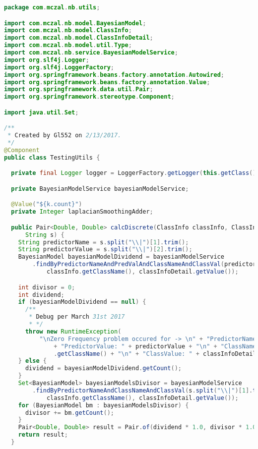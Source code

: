 \begin{lstlisting}[language=Java,basicstyle=\tiny,caption=TestingUtils.java]
package com.mczal.nb.utils;

import com.mczal.nb.model.BayesianModel;
import com.mczal.nb.model.ClassInfo;
import com.mczal.nb.model.ClassInfoDetail;
import com.mczal.nb.model.util.Type;
import com.mczal.nb.service.BayesianModelService;
import org.slf4j.Logger;
import org.slf4j.LoggerFactory;
import org.springframework.beans.factory.annotation.Autowired;
import org.springframework.beans.factory.annotation.Value;
import org.springframework.data.util.Pair;
import org.springframework.stereotype.Component;

import java.util.Set;

/**
 * Created by Gl552 on 2/13/2017.
 */
@Component
public class TestingUtils {

  private final Logger logger = LoggerFactory.getLogger(this.getClass());

  private BayesianModelService bayesianModelService;

  @Value("${k.count}")
  private Integer laplacianSmoothingAdder;

  public Pair<Double, Double> calcDiscrete(ClassInfo classInfo, ClassInfoDetail classInfoDetail,
      String s) {
    String predictorName = s.split("\\|")[1].trim();
    String predictorValue = s.split("\\|")[2].trim();
    BayesianModel bayesianModelDividend = bayesianModelService
        .findByPredictorNameAndPredValAndClassNameAndClassVal(predictorName, predictorValue,
            classInfo.getClassName(), classInfoDetail.getValue());

    int divisor = 0;
    int dividend;
    if (bayesianModelDividend == null) {
      /**
       * Debug per March 31st 2017
       * */
      throw new RuntimeException(
          "\nZero Frequency problem occured for -> \n" + "PredictorName: " + predictorName + "\n"
              + "PredictorValue: " + predictorValue + "\n" + "ClassName: " + classInfo
              .getClassName() + "\n" + "ClassValue: " + classInfoDetail.getValue() + "\n");
    } else {
      dividend = bayesianModelDividend.getCount();
    }
    Set<BayesianModel> bayesianModelsDivisor = bayesianModelService
        .findByPredictorNameAndClassNameAndClassVal(s.split("\\|")[1].trim(),
            classInfo.getClassName(), classInfoDetail.getValue());
    for (BayesianModel bm : bayesianModelsDivisor) {
      divisor += bm.getCount();
    }
    Pair<Double, Double> result = Pair.of(dividend * 1.0, divisor * 1.0);
    return result;
  }


\end{lstlisting}
